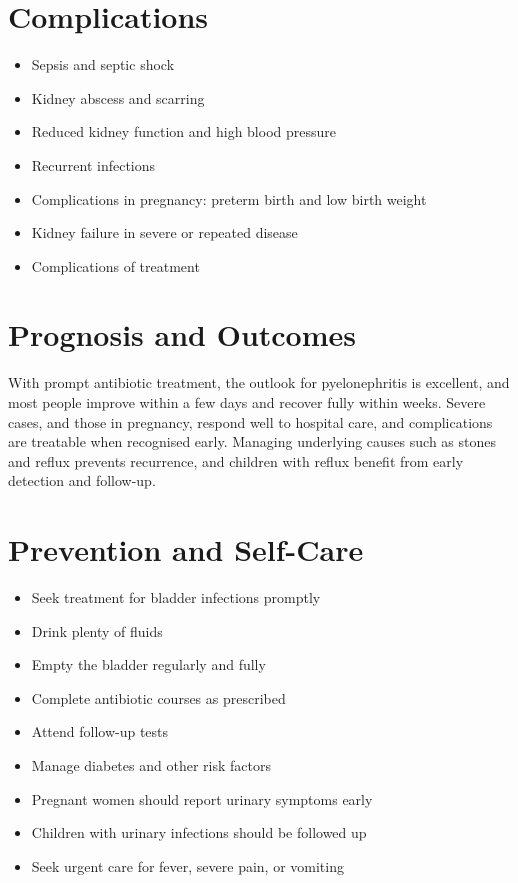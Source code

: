 \section*{Complications}
\begin{itemize}
    \item Sepsis and septic shock
    \item Kidney abscess and scarring
    \item Reduced kidney function and high blood pressure
    \item Recurrent infections
    \item Complications in pregnancy: preterm birth and low birth weight
    \item Kidney failure in severe or repeated disease
    \item Complications of treatment
\end{itemize}

\section*{Prognosis and Outcomes}
With prompt antibiotic treatment, the outlook for pyelonephritis is excellent, and most people improve within a few days and recover fully within weeks. Severe cases, and those in pregnancy, respond well to hospital care, and complications are treatable when recognised early. Managing underlying causes such as stones and reflux prevents recurrence, and children with reflux benefit from early detection and follow-up.

\section*{Prevention and Self-Care}
\begin{itemize}
    \item Seek treatment for bladder infections promptly
    \item Drink plenty of fluids
    \item Empty the bladder regularly and fully
    \item Complete antibiotic courses as prescribed
    \item Attend follow-up tests
    \item Manage diabetes and other risk factors
    \item Pregnant women should report urinary symptoms early
    \item Children with urinary infections should be followed up
    \item Seek urgent care for fever, severe pain, or vomiting
\end{itemize}

